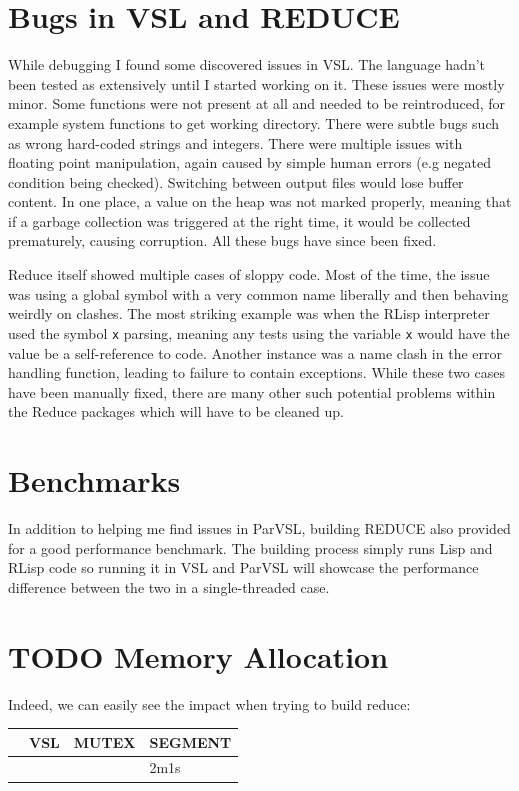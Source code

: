 \section{Bugs in VSL and REDUCE}

While debugging I found some discovered issues in VSL. The language hadn't been tested
as extensively until I started working on it. These issues were mostly minor. Some functions
were not present at all and needed to be reintroduced, for example system functions to get
working directory. There were subtle bugs such as wrong
hard-coded strings and integers. There were multiple issues with floating point manipulation,
again caused by simple human errors (e.g negated condition being checked). Switching between
output files would lose buffer content. In one place, a value on the heap was not marked
properly, meaning that if a garbage collection was triggered at the right time, it would
be collected prematurely, causing corruption. All these bugs have since been fixed.

Reduce itself showed multiple cases of sloppy code. Most of the time, the issue was using
a global symbol with a very common name liberally and then behaving weirdly
on clashes. The most striking example was when the RLisp interpreter used the symbol \texttt{x}
parsing, meaning any tests using the variable \texttt{x} would have the value be a self-reference
to code. Another instance was a name clash in the error handling function, leading to failure
to contain exceptions. While these two cases have been manually fixed, there are many other
such potential problems within the Reduce packages which will have to be cleaned up.

\section{Benchmarks}

In addition to helping me find issues in ParVSL, building REDUCE also provided for a
good performance benchmark. The building process simply runs Lisp and RLisp code so
running it in VSL and ParVSL will showcase the performance difference between the
two in a single-threaded case.

\section{{\bfseries\sffamily TODO} Memory Allocation}
Indeed, we can easily see the impact when trying to build reduce:

\begin{center}
\begin{tabular}{llll}
 & VSL & MUTEX & SEGMENT\\
\hline
 &  &  & 2m1s\\
\end{tabular}
\end{center}


